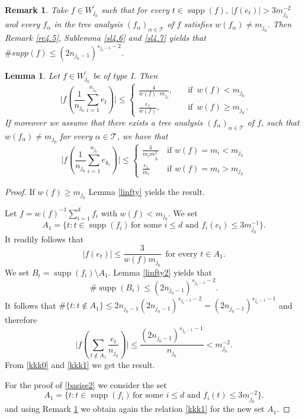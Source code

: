 \documentclass[a4paper]{amsart}
\theoremstyle{plain}
\newtheorem{lemma}[theorem]{Lemma}
\newtheorem{remark}[theorem]{Remark}
\newcommand{\mc}{\mathcal}
\newcommand{\fa}{f_{\alpha}}
\DeclareMathOperator{\supp}{supp}
\begin{document}
\begin{remark}\label{re4.8}
Take $f\in W_{j_0}^{\prime}$ such that for every $t\in\supp(f)$,
$|f(e_t)|>3m_{j_0}^{-2}$ and every $\fa$ in the tree analysis   $(\fa)_{\alpha\in\mc{T}}$
of $f$ satisfies $w(\fa)\ne m_{j_0}$.  Then Remark \ref{re4.5}, Sublemma \ref{sl4.6} and
\ref{sl4.7} yields that  $\#supp(f)\leq (2n_{j_0-1})^{s_{j_0-1}-2}$.
\end{remark}
\begin{lemma} \label{42}
Let $f\in W_{j_0}^{\prime}$ be of type I. Then 
\begin{equation}\label{basise1}
\,\,\,\vert f(\frac{1}{n_{j_0}}\sum_{i=1}^{n_{j_0}}e_{t})\vert \leq
\begin{cases}
\frac{4}{w(f)\cdot m_{j_0}},\quad &\text{if}\,\,\,w(f)<m_{j_0}\\
\frac{c_{1}}{w(f)},\quad &\text{if}\,\,\,w(f)\geq m_{j_0}\,.
\end{cases}
\end{equation}
If moreover we  assume that there exists a tree analysis
$(f_{\alpha})_{\alpha\in\mc{T}}$ of $f$, such that
$w(f_{\alpha})\not= m_{j_0}$
for every $\alpha\in\mc{T}$,  we have that
\begin{equation}\label{basise2}
\vert f(\frac{1}{n_{j_0}}\sum_{i=1}^{n_{j_0}}e_{k_{i}})\vert \leq
\begin{cases}
\frac{4}{m_{i}m_{j_0}^{2}}\,&\textrm{if $w(f)=m_{i}<m_{j_0}$}\\
\frac{c_{1}}{m_{i}}\,&\textrm{if $w(f)=m_{i}>m_{j_0}$}
\end{cases}
\end{equation}
\end{lemma}
\begin{proof}
If $w(f)\geq m_{j_0}$ Lemma \ref{linfty} yields the result.

Let $f=w(f)^{-1}\sum_{i=1}^{d}f_{i}$ with $w(f)<m_{j_0}$.
We set
$$A_{1}=\{t: t\in\supp(f_i)\,\text{for some $i\leq  d$ and}\,\, f_{i}(e_t)\leq 3m_{j_0}^{-1}\}.
$$
It readily follows that
\begin{equation}\label{kkk0}
\vert f(e_t)\vert\leq \frac{3}{w(f)m_{j_0}}\,\,\,\text{for every $t\in A_1$}.
\end{equation}
We set $B_{i}=\supp(f_{i})\setminus A_{1}$. Lemma \ref{linfty2} yields that
$$\#\supp (B_{i})\leq (2n_{j_0-1})^{s_{j_0-1}-2}.
$$
It follows that $\#\{t: t\not\in A_{1}\}\leq 2n_{j_0-1}(2n_{j_0-1})^{s_{j_0-1}-2}=(2n_{j_0-1})^{s_{j_0-1}-1}$ and therefore
\begin{equation}\label{kkk1}
\vert f(\sum_{t\not\in A_{1}}\frac{e_t}{n_{j_0}})\vert\leq
\frac{(2n_{j_0-1})^{s_{j_0-1}-1}}{n_{j_0}}<m_{j_0}^{-2}.
\end{equation}
From \eqref{kkk0} and \eqref{kkk1} we get the result.

For the proof of \eqref{basise2}  we consider the set
$$
A_{1}=\{t: t\in\supp(f_i)\,\text{for some $i\leq  d$ and}\,\, f_{i}(t)\leq
3m_{j_0}^{-2}\}.
$$
and using Remark \ref{re4.8} we obtain  again the relation \eqref{kkk1} for the new set $A_{1}$.
\end{proof}
\end{document}
